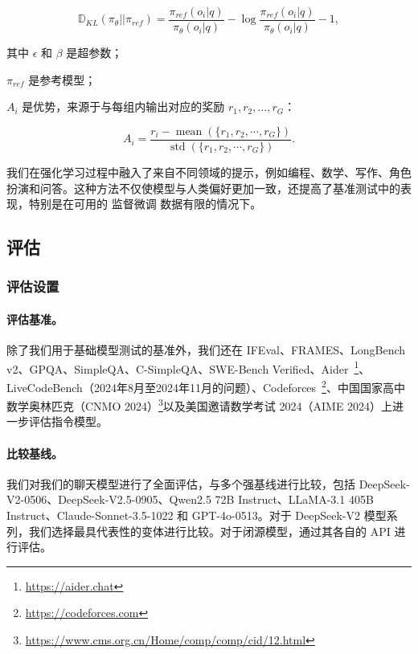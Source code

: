 \documentclass[lang=cn,a4paper,newtx]{elegantpaper}
\newcommand{\dsvii}{DeepSeek-V2}
\begin{document}
\begin{equation}
    \mathbb{D}_{KL}\left(\pi_{\theta} || \pi_{ref}\right) = \frac{\pi_{ref}(o_i|q)}{\pi_{\theta}(o_i|q)}- \log\frac{\pi_{ref}(o_i|q)}{\pi_{\theta}(o_i|q)} - 1,
\end{equation}

其中 $\epsilon$ 和 $\beta$ 是超参数；

$\pi_{ref}$ 是参考模型；

$A_i$ 是优势，来源于与每组内输出对应的奖励 ${r_1, r_2, \ldots, r_G}$：

\begin{equation}
    A_i = \frac{r_i - {\operatorname{mean}(\{r_1, r_2, \cdots, r_G\})}}{{\operatorname{std}(\{r_1, r_2, \cdots, r_G\})}}.
\end{equation}

我们在强化学习过程中融入了来自不同领域的提示，例如编程、数学、写作、角色扮演和问答。这种方法不仅使模型与人类偏好更加一致，还提高了基准测试中的表现，特别是在可用的 监督微调 数据有限的情况下。

\subsection{评估}

\subsubsection{评估设置}

\paragraph{评估基准。}
除了我们用于基础模型测试的基准外，我们还在 IFEval、FRAMES、LongBench v2、GPQA、SimpleQA、C-SimpleQA、SWE-Bench Verified、Aider~\footnote{\url{https://aider.chat}}、LiveCodeBench（2024年8月至2024年11月的问题）、Codeforces~\footnote{\url{https://codeforces.com}}、中国国家高中数学奥林匹克（CNMO 2024）\footnote{\url{https://www.cms.org.cn/Home/comp/comp/cid/12.html}}以及美国邀请数学考试 2024（AIME 2024）上进一步评估指令模型。

\paragraph{比较基线。}
我们对我们的聊天模型进行了全面评估，与多个强基线进行比较，包括 \dsvii{}-0506、DeepSeek-V2.5-0905、Qwen2.5 72B Instruct、LLaMA-3.1 405B Instruct、Claude-Sonnet-3.5-1022 和 GPT-4o-0513。对于 \dsvii{} 模型系列，我们选择最具代表性的变体进行比较。对于闭源模型，通过其各自的 API 进行评估。
\end{document}
